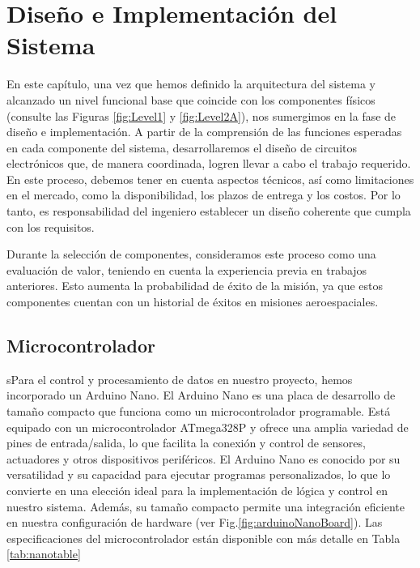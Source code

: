 \chapter{Diseño e Implementación del Sistema}

En este capítulo, una vez que hemos definido la arquitectura del sistema y alcanzado un nivel funcional base que coincide con los componentes físicos (consulte las Figuras \ref{fig:Level1} y \ref{fig:Level2A}), nos sumergimos en la fase de diseño e implementación. A partir de la comprensión de las funciones esperadas en cada componente del sistema, desarrollaremos el diseño de circuitos electrónicos que, de manera coordinada, logren llevar a cabo el trabajo requerido. En este proceso, debemos tener en cuenta aspectos técnicos, así como limitaciones en el mercado, como la disponibilidad, los plazos de entrega y los costos. Por lo tanto, es responsabilidad del ingeniero establecer un diseño coherente que cumpla con los requisitos.

\hspace{1.27cm}Durante la selección de componentes, consideramos este proceso como una evaluación de valor, teniendo en cuenta la experiencia previa en trabajos anteriores. Esto aumenta la probabilidad de éxito de la misión, ya que estos componentes cuentan con un historial de éxitos en misiones aeroespaciales.

\newpage




\section{Microcontrolador}
sPara el control y procesamiento de datos en nuestro proyecto, hemos incorporado un Arduino Nano. El Arduino Nano es una placa de desarrollo de tamaño compacto que funciona como un microcontrolador programable. Está equipado con un microcontrolador ATmega328P y ofrece una amplia variedad de pines de entrada/salida, lo que facilita la conexión y control de sensores, actuadores y otros dispositivos periféricos. El Arduino Nano es conocido por su versatilidad y su capacidad para ejecutar programas personalizados, lo que lo convierte en una elección ideal para la implementación de lógica y control en nuestro sistema. Además, su tamaño compacto permite una integración eficiente en nuestra configuración de hardware \cite{arduino-nano} (ver Fig.\ref{fig:arduinoNanoBoard}). Las especificaciones del microcontrolador están disponible con más detalle en Tabla \ref{tab:nanotable}

